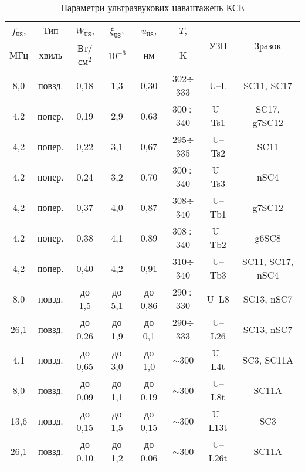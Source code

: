 \begin{table}
\caption{\label{tabUSL}Параметри ультразвукових навантажень КСЕ
}
\center
\renewcommand{\tabcolsep}{1.5mm}
\begin{tabular}{|c|c|c|c|c|c|c|c|}
\hline
$f_\mathtt{US}$,&Тип&$W_{\mathtt{US}}$,&$\xi_{\mathtt{US}}$,&$u_{\mathtt{US}}$,&$T$,&\multirow{2}{*}{УЗН}
&\multirow{2}{*}{Зразок}\\
МГц&хвиль&Вт/см$^2$&$10^{-6}$&нм&K&&\\
\hline
8,0&повзд.&0,18&1,3&0,30&302$\div$333&U--L&SC11, SC17\\ \hline
4,2&попер.&0,19&2,9&0,63&300$\div$340&U--Ts1&SC17, g7SC12\\ \hline
4,2&попер.&0,22&3,1&0,67&295$\div$335&U--Ts2&SC11\\ \hline
4,2&попер.&0,24&3,2&0,70&300$\div$340&U--Ts3&nSC4\\ \hline
4,2&попер.&0,37&4,0&0,87&308$\div$340&U--Tb1&g7SC12\\ \hline
4,2&попер.&0,38&4,1&0,89&308$\div$340&U--Tb2&g6SC8\\ \hline
4,2&попер.&0,40&4,2&0,91&310$\div$340&U--Tb3&SC11, SC17, nSC4\\
\hline
8,0&повзд.&до 1,5&до 5,1&до 0,86&290$\div$330&U--L8&SC13, nSC7\\ \hline
26,1&повзд.&до 0,26&до 1,9&до 0,1&290$\div$333&U--L26&SC13, nSC7\\ \hline
4,1&повзд.&до 0,65&до 3,0&до 1,0&$\sim$300&U--L4t&SC3, SC11A\\ \hline
8,0&повзд.&до 0,09&до 1,1&до 0,19&$\sim$300&U--L8t&SC11A\\ \hline
13,6&повзд.&до 0,15&до 1,5&до 0,15&$\sim$300&U--L13t&SC3\\ \hline
26,1&повзд.&до 0,10&до 1,2&до 0,06&$\sim$300&U--L26t& SC11A\\ \hline
\end{tabular}
\end{table}




